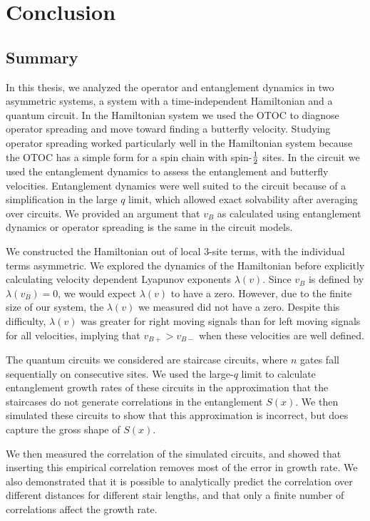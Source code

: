 \section{Conclusion} 

\subsection{Summary} \label{sub:sum}

In this thesis, we analyzed the operator and entanglement dynamics in two asymmetric systems, a system with a time-independent Hamiltonian and a quantum circuit. In the Hamiltonian system we used the OTOC to diagnose operator spreading and move toward finding a butterfly velocity. Studying operator spreading worked particularly well in the Hamiltonian system because the OTOC has a simple form for a spin chain with spin-$\frac{1}{2}$ sites. In the circuit we used the entanglement dynamics to assess the entanglement and butterfly velocities. Entanglement dynamics were well suited to the circuit because of a simplification in the large $q$ limit, which allowed exact solvability after averaging over circuits. We provided an argument that $v_B$ as calculated using entanglement dynamics or operator spreading is the same in the circuit models.

We constructed the Hamiltonian out of local 3-site terms, with the individual terms asymmetric. We explored the dynamics of the Hamiltonian before explicitly calculating velocity dependent Lyapunov exponents $\lambda(v)$. Since $v_B$ is defined by $\lambda(v_B)=0$, we would expect $\lambda(v)$ to have a zero. However, due to the finite size of our system, the $\lambda(v)$ we measured did not have a zero. Despite this difficulty, $\lambda(v)$ was greater for right moving signals than for left moving signals for all velocities, implying that $v_{B+}>v_{B-}$ when these velocities are well defined.

The quantum circuits we considered are staircase circuits, where $n$ gates fall sequentially on consecutive sites. We used the large-$q$ limit to calculate entanglement growth rates of these circuits in the approximation that the staircases do not generate correlations in the entanglement $S(x)$. We then simulated these circuits to show that this approximation is incorrect, but does capture the gross shape of $S(x)$. 

We then measured the correlation of the simulated circuits, and showed that inserting this empirical correlation removes most of the error in growth rate. We also demonstrated that it is possible to analytically predict the correlation over different distances for different stair lengths, and that only a finite number of correlations affect the growth rate.

